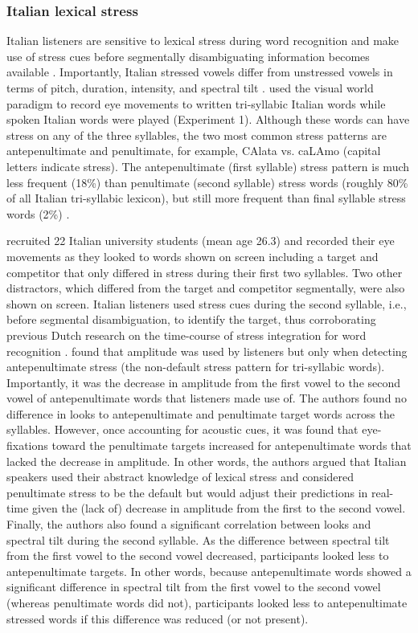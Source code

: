 \subsubsection{Italian lexical stress}
Italian listeners are sensitive to lexical stress during word recognition and make use of stress cues before segmentally disambiguating information becomes available \citep{Tagliapietra2005, Sulpizio_McQueen_2012}. Importantly, Italian stressed vowels differ from unstressed vowels in terms of pitch, duration, intensity, and spectral tilt \citep{Maturi1998}. \cite{Sulpizio_McQueen_2012} used the visual world paradigm to record eye movements to written tri-syllabic Italian words while spoken Italian words were played (Experiment 1). Although these words can have stress on any of the three syllables, the two most common stress patterns are antepenultimate and penultimate, for example, CAlata vs. caLAmo (capital letters indicate stress). The antepenultimate (first syllable) stress pattern is much less frequent (18\%) than penultimate (second syllable) stress words (roughly 80\% of all Italian tri-syllabic lexicon), but still more frequent than final syllable stress words (2\%) \citep{thornton_1997}. 

\cite{Sulpizio_McQueen_2012} recruited 22 Italian university students (mean age 26.3) and recorded their eye movements as they looked to words shown on screen including a target and competitor that only differed in stress during their first two syllables. Two other distractors, which differed from the target and competitor segmentally, were also shown on screen. Italian listeners used stress cues during the second syllable, i.e., before segmental disambiguation, to identify the target, thus corroborating previous Dutch research on the time-course of stress integration for word recognition \citep{Reinisch2010}. \cite{Sulpizio_McQueen_2012} found that amplitude was used by listeners but only when detecting antepenultimate stress (the non-default stress pattern for tri-syllabic words). Importantly, it was the decrease in amplitude from the first vowel to the second vowel of antepenultimate words that listeners made use of. The authors found no difference in looks to antepenultimate and penultimate target words across the syllables. However, once accounting for acoustic cues, it was found that eye-fixations toward the penultimate targets increased for antepenultimate words that lacked the decrease in amplitude. In other words, the authors argued that Italian speakers used their abstract knowledge of lexical stress and considered penultimate stress to be the default but would adjust their predictions in real-time given the (lack of) decrease in amplitude from the first to the second vowel. Finally, the authors also found a significant correlation between looks and spectral tilt during the second syllable. As the difference between spectral tilt from the first vowel to the second vowel decreased, participants looked less to antepenultimate targets. In other words, because antepenultimate words showed a significant difference in spectral tilt from the first vowel to the second vowel (whereas penultimate words did not), participants looked less to antepenultimate stressed words if this difference was reduced (or not present). 



